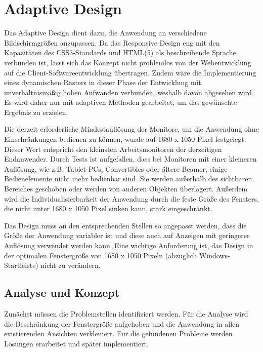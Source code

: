 \chapter{Adaptive Design}
Das Adaptive Design dient dazu, die Anwendung an verschiedene Bildschirmgrößen anzupassen. Da das Responsive Design eng mit den Kapazitäten des CSS3-Standards und HTML(5) als beschreibende Sprache verbunden ist, lässt sich das Konzept nicht problemlos von der Webentwicklung auf die Client-Softwareentwicklung übertragen. Zudem wäre die Implementierung eines dynamischen Rasters in dieser Phase der Entwicklung mit unverhältnismäßig hohen Aufwänden verbunden, weshalb davon abgesehen wird. Es wird daher nur mit adaptiven Methoden gearbeitet, um das gewünschte Ergebnis zu erzielen.\par
Die derzeit erforderliche Mindestauflösung der Monitore, um die Anwendung ohne Einschränkungen bedienen zu können, wurde auf 1680 x 1050 Pixel festgelegt. Dieser Wert entspricht den kleinsten Arbeitsmonitoren der derzeitigen Endanwender. Durch Tests ist aufgefallen, dass bei Monitoren mit einer kleineren Auflösung, wie z.B. Tablet-PCs, Convertibles oder ältere Beamer, einige Bedienelemente nicht mehr bedienbar sind. Sie werden außerhalb des sichtbaren Bereiches geschoben oder werden von anderen Objekten überlagert. Außerdem wird die Individualisierbarkeit der Anwendung durch die feste Größe des Fensters, die nicht unter 1680 x 1050 Pixel sinken kann, stark eingeschränkt.\par
Das Design muss an den entsprechenden Stellen so angepasst werden, dass die Größe der Anwendung variabler ist und diese auch auf Anzeigen mit geringerer Auflösung verwendet werden kann. Eine wichtige Anforderung ist, das Design in der optimalen Fenstergröße von 1680 x 1050 Pixeln (abzüglich Windows- Startleiste) nicht zu verändern.\par
\section{Analyse und Konzept} \label{sec:responsiveConcept}
Zunächst müssen die Problemstellen identifiziert werden. Für die Analyse wird die Beschränkung der Fenstergröße aufgehoben und die Anwendung in allen existierenden Ansichten verkleinert. Für die gefundenen Probleme werden Lösungen erarbeitet und später implementiert.\par
